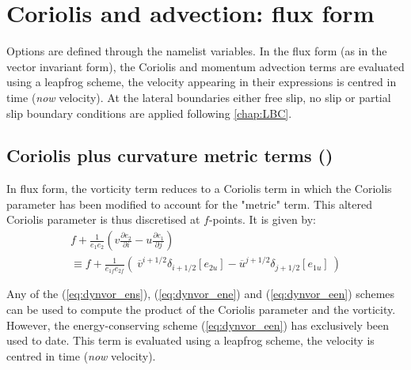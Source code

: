 \documentclass[../main/NEMO_manual]{subfiles}
\begin{document}
\section{Coriolis and advection: flux form}
\label{sec:DYN_adv_cor_flux}


Options are defined through the  namelist variables.
In the flux form (as in the vector invariant form),
the Coriolis and momentum advection terms are evaluated using a leapfrog scheme,
\ie the velocity appearing in their expressions is centred in time (\textit{now} velocity).
At the lateral boundaries either free slip,
no slip or partial slip boundary conditions are applied following \autoref{chap:LBC}.


\subsection{Coriolis plus curvature metric terms (\protect{}) }
\label{subsec:DYN_cor_flux}

In flux form, the vorticity term reduces to a Coriolis term in which the Coriolis parameter has been modified to account for the "metric" term.
This altered Coriolis parameter is thus discretised at $f$-points.
It is given by: 
\begin{multline*}
  f+\frac{1}{e_1 e_2 }\left( {v\frac{\partial e_2 }{\partial i}  -  u\frac{\partial e_1 }{\partial j}} \right)  \\
  \equiv   f + \frac{1}{e_{1f} e_{2f} } \left( { \ \overline v ^{i+1/2}\delta_{i+1/2} \left[ {e_{2u} } \right]
      -  \overline u ^{j+1/2}\delta_{j+1/2} \left[ {e_{1u} } \right]  }  \ \right)
\end{multline*} 

Any of the (\autoref{eq:dynvor_ens}), (\autoref{eq:dynvor_ene}) and (\autoref{eq:dynvor_een}) schemes can be used to
compute the product of the Coriolis parameter and the vorticity.
However, the energy-conserving scheme (\autoref{eq:dynvor_een}) has exclusively been used to date.
This term is evaluated using a leapfrog scheme, \ie the velocity is centred in time (\textit{now} velocity).
\end{document}
